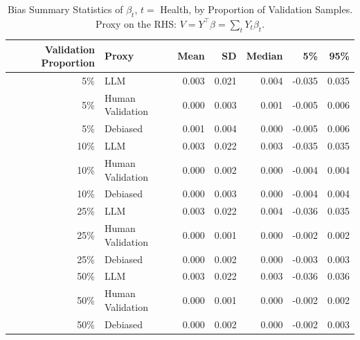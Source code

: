 \begin{table}

\caption{\label{tab:unnamed-chunk-1}Bias Summary Statistics of $\beta_{t}$, $t=$ Health, by Proportion of Validation Samples.
      Proxy on the RHS: $V = Y^\top \beta = \sum_{t} Y_t \beta_t$.}
\centering
\begin{tabular}[t]{rlrrrrr}
\toprule
Validation Proportion & Proxy & Mean & SD & Median & 5\% & 95\%\\
\midrule
5\% & LLM & 0.003 & 0.021 & 0.004 & -0.035 & 0.035\\
5\% & Human Validation & 0.000 & 0.003 & 0.001 & -0.005 & 0.006\\
5\% & Debiased & 0.001 & 0.004 & 0.000 & -0.005 & 0.006\\
10\% & LLM & 0.003 & 0.022 & 0.003 & -0.035 & 0.035\\
10\% & Human Validation & 0.000 & 0.002 & 0.000 & -0.004 & 0.004\\
10\% & Debiased & 0.000 & 0.003 & 0.000 & -0.004 & 0.004\\
25\% & LLM & 0.003 & 0.022 & 0.004 & -0.036 & 0.035\\
25\% & Human Validation & 0.000 & 0.001 & 0.000 & -0.002 & 0.002\\
25\% & Debiased & 0.000 & 0.002 & 0.000 & -0.003 & 0.003\\
50\% & LLM & 0.003 & 0.022 & 0.003 & -0.036 & 0.036\\
50\% & Human Validation & 0.000 & 0.001 & 0.000 & -0.002 & 0.002\\
50\% & Debiased & 0.000 & 0.002 & 0.000 & -0.002 & 0.003\\
\bottomrule
\end{tabular}
\end{table}

